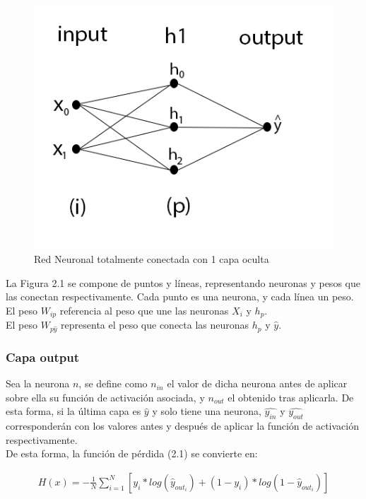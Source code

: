 \begin{figure}[H]
	\centering
	\includegraphics[scale=0.35]{imagenes/nn_1_capa.jpg}  
	\caption{Red Neuronal totalmente conectada con 1 capa oculta}
	\label{fig:nn_1_capa}
\end{figure}

La Figura 2.1 se compone de puntos y líneas, representando neuronas y pesos que las conectan respectivamente. Cada punto es una neurona, y cada línea un peso. \\
El peso $W_{ip}$ referencia al peso que une las neuronas $X_i$ y $h_p$.\\
El peso $W_{p\hat{y}}$ representa el peso que conecta las neuronas $h_p$ y $\hat{y}$.


\subsubsection{Capa output}

Sea la neurona $n$, se define como $n_{in}$ el valor de dicha neurona antes de aplicar sobre ella su función de activación asociada, y $n_{out}$ el obtenido tras aplicarla.
De esta forma, si la última capa es $\hat{y}$ y solo tiene una neurona, $\hat{y_{in}}$ y $\hat{y_{out}}$ corresponderán con los valores antes y después de aplicar la función de activación respectivamente.\\

De esta forma, la función de pérdida (2.1) se convierte en:

\begin{gather}
    H(x) = - \frac{1}{N} \sum_{i=1}^{N}  [y_i * log( \hat{y}_{out_i}) + (1-y_i)*log(1-\hat{y}_{out_i})]
\end{gather}

